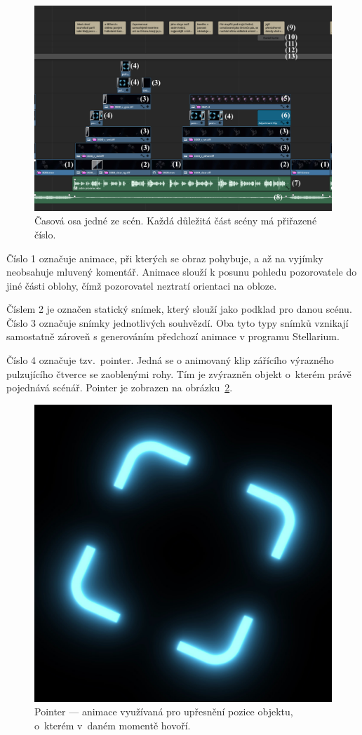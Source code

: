 \documentclass[12pt,a4paper,titlepage]{article}
\begin{document}
\begin{figure}[H]
	\centering
	\includegraphics[width=1\textwidth]{timeline_annotated.eps}
	\caption{Časová osa jedné ze scén. Každá důležitá část scény má přiřazené číslo.}\label{img:timeline}
\end{figure}
Číslo 1 označuje animace, při kterých se obraz pohybuje, a až na vyjímky neobsahuje mluvený komentář. Animace slouží k posunu pohledu pozorovatele do jiné části oblohy, čímž pozorovatel neztratí orientaci na obloze. 

Číslem 2 je označen statický snímek, který slouží jako podklad pro danou scénu. Číslo 3 označuje snímky jednotlivých souhvězdí. Oba tyto typy snímků vznikají samostatně zároveň s generováním předchozí animace v programu Stellarium.

Číslo 4 označuje tzv.\ pointer. Jedná se o animovaný klip zářícího výrazného pulzujícího čtverce se zaoblenými rohy. Tím je zvýrazněn objekt o~kterém právě pojednává scénář. Pointer je zobrazen na obrázku~\ref{img:pointer}. 

\begin{figure}[H]
	\centering
	\includegraphics[width=.5\textwidth]{pointer.eps}
	\caption{Pointer --- animace využívaná pro upřesnění pozice objektu, o~kterém v~daném momentě hovoří.}\label{img:pointer}
\end{figure}
\end{document}
